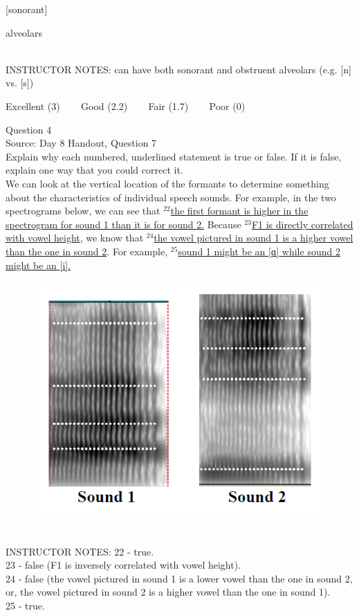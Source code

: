\documentclass[12pt]{article}
\begin{document}
{[sonorant]}

alveolars


~\\
INSTRUCTOR NOTES: can have both sonorant and obstruent alveolars (e.g. [n] vs. [s])


\vfill
Excellent (3) ~~~ Good (2.2) ~~~ Fair (1.7) ~~~ Poor (0)
\newpage

{\large Question 4}\\

Source: Day 8 Handout, Question 7\\

Explain why each numbered, underlined statement is true or false. If it is false, explain one way that you could correct it.\\

We can look at the vertical location of the formants to determine something about the characteristics of individual speech sounds. For example, in the two spectrograms below, we can see that $^{22}$\ul{the first formant is higher in the spectrogram for sound 1 than it is for sound 2.} Because $^{23}$\ul{F1 is directly correlated with vowel height}, we know that $^{24}$\ul{the vowel pictured in sound 1 is a higher vowel than the one in sound 2}. For example, $^{25}$\ul{sound 1 might be an {[ɑ]} while sound 2 might be an {[i]}.}

\begin{figure}[H]
\includegraphics{../images/sound1a_sound2i.png}
\end{figure}

~\\
INSTRUCTOR NOTES: 22 - true. \\23 - false (F1 is inversely correlated with vowel height). \\24 - false (the vowel pictured in sound 1 is a lower vowel than the one in sound 2, or, the vowel pictured in sound 2 is a higher vowel than the one in sound 1).\\25 - true.
\end{document}
